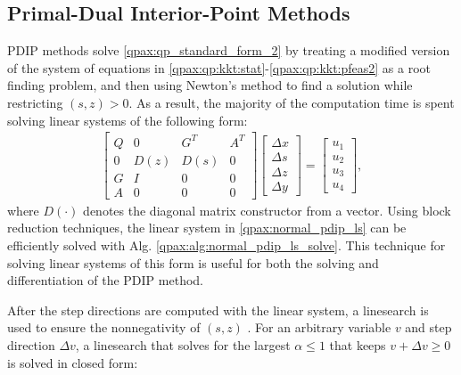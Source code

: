 \subsection{Primal-Dual Interior-Point Methods}
PDIP methods solve \eqref{qpax:qp_standard_form_2} by treating a modified version of the system of equations in \eqref{qpax:qp:kkt:stat}-\eqref{qpax:qp:kkt:pfeas2} as a root finding problem, and then using Newton's method to find a solution while restricting $(s, z) > 0$. As a result, the majority of the computation time is spent solving linear systems of the following form:
\begin{align}
    \begin{bmatrix}
Q & 0 & G^{T} & A^{T} \\
0 & D(z) & D(s) & 0 \\
G & I & 0 & 0 \\
A & 0 & 0 & 0
\end{bmatrix} \begin{bmatrix}
\Delta x\\
\Delta s \\
\Delta z \\
\Delta y
\end{bmatrix}=\begin{bmatrix}
u_1 \\ u_2 \\ u_3 \\ u_4
\end{bmatrix}, \label{qpax:normal_pdip_ls}
\end{align}
where $D(\cdot)$ denotes the diagonal matrix constructor from a vector. Using block reduction techniques, the linear system in \eqref{qpax:normal_pdip_ls} can be efficiently solved with Alg. \eqref{qpax:alg:normal_pdip_ls_solve}. This technique for solving linear systems of this form is useful for both the solving and differentiation of the PDIP method. 

After the step directions are computed with the linear system, a linesearch is used to ensure the nonnegativity of $(s, z)$ .  For an arbitrary variable $v$ and step direction $\Delta v$, a linesearch that solves for the largest $\alpha \leq 1$ that keeps $v + \Delta v\geq 0$ is solved in closed form:

